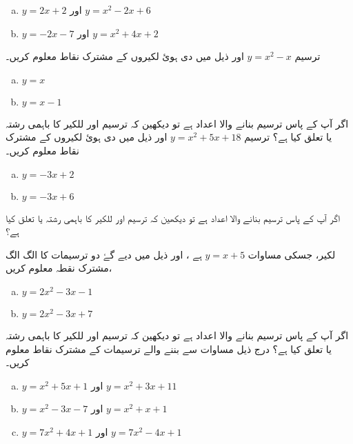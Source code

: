 \begin{enumerate}[a.]
\item \(y=2x+2   \)         اور \(  y=x^{2}-2x+6 \)      
\item \( y=-2x-7 \)  اور \(y=x^{2}+4x+2  \)    
 \end{enumerate}
ترسیم \(y=x^{2}-x\) اور ذیل میں دی ہوئ لکیروں کے مشترک نقاط معلوم کریں۔
\begin{enumerate}[a.]
\item \(y=x  \)      
\item \(y=x-1\)  
 \end{enumerate}
اگر آپ کے پاس ترسیم بنانے والا اعداد ہے تو دیکھین کہ ترسیم اور للکیر کا باہمی رشتہ یا تعلق کیا ہے؟
ترسیم \(y=x^{2}+5x+18\) اور ذیل میں دی ہوئ لکیروں کے مشترک نقاط معلوم کریں۔
\begin{enumerate}[a.]
\item \(y=-3x+2 \)      
\item \(y=-3x+6\)  
 \end{enumerate}
اگر آپ کے پاس ترسیم بنانے والا اعداد ہے تو دیکھین کہ ترسیم اور للکیر کا باہمی رشتہ یا تعلق کیا ہے؟
 
لکیر، جسکی مساوات \(y=x+5\) ہے ، اور ذیل میں دیے گۓ دو ترسیمات کا الگ الگ ،مشترک نقطہ معلوم کریں 
\begin{enumerate}[a.]
\item \(y=2x^{2}-3x-1 \)      
\item \(y=2x^{2}-3x+7\)  
 \end{enumerate}
اگر آپ کے پاس ترسیم بنانے والا اعداد ہے تو دیکھین کہ ترسیم اور للکیر کا باہمی رشتہ یا تعلق کیا ہے؟
درج ذیل مساوات سے بننے والے ترسیمات کے مشترک نقاط معلوم کریں۔ 
\begin{enumerate}[a.]
\item \( y=x^{2}+5x+1    \)           اور  \(   y=x^{2}+3x+11 \)
\item \(y=x^{2}-3x-7 \) اور  \(  y=x^{2}+x+1 \)
\item \( y=7x^{2}+4x+1\) اور  \(   y=7x^{2}-4x+1 \)
  \end{enumerate}

